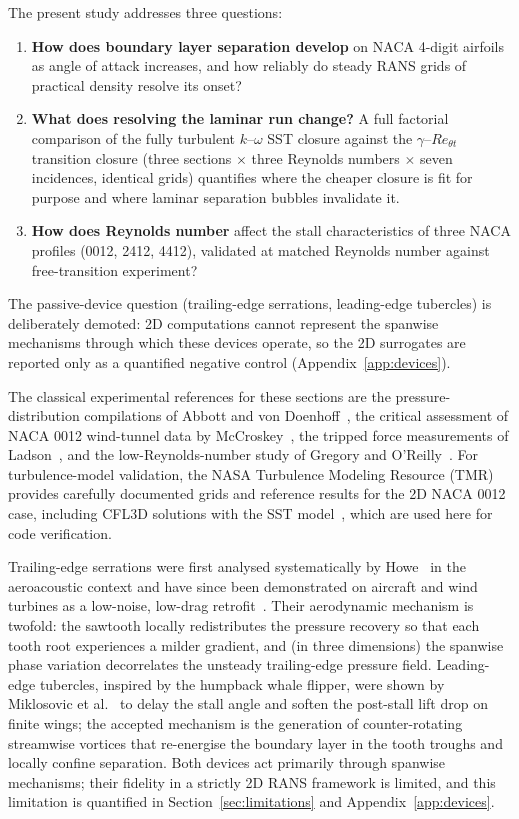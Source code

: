 \documentclass[11pt,a4paper]{article}
\begin{document}
The present study addresses three questions:
\begin{enumerate}
  \item \textbf{How does boundary layer separation develop} on NACA 4-digit airfoils as angle of attack increases, and how reliably do steady RANS grids of practical density resolve its onset?
  \item \textbf{What does resolving the laminar run change?} A full factorial comparison of the fully turbulent $k$--$\omega$ SST closure against the $\gamma$--$Re_{\theta t}$ transition closure (three sections $\times$ three Reynolds numbers $\times$ seven incidences, identical grids) quantifies where the cheaper closure is fit for purpose and where laminar separation bubbles invalidate it.
  \item \textbf{How does Reynolds number} affect the stall characteristics of three NACA profiles (0012, 2412, 4412), validated at matched Reynolds number against free-transition experiment?
\end{enumerate}
The passive-device question (trailing-edge serrations, leading-edge tubercles) is deliberately demoted: 2D computations cannot represent the spanwise mechanisms through which these devices operate, so the 2D surrogates are reported only as a quantified negative control (Appendix~\ref{app:devices}).

The classical experimental references for these sections are the pressure-distribution compilations of Abbott and von Doenhoff~\cite{abbott1959}, the critical assessment of NACA 0012 wind-tunnel data by McCroskey~\cite{mccroskey1987}, the tripped force measurements of Ladson~\cite{ladson1988}, and the low-Reynolds-number study of Gregory and O'Reilly~\cite{gregory1970}. For turbulence-model validation, the NASA Turbulence Modeling Resource (TMR)~\cite{tmr} provides carefully documented grids and reference results for the 2D NACA 0012 case, including CFL3D solutions with the SST model~\cite{cfl3dtmr}, which are used here for code verification.

Trailing-edge serrations were first analysed systematically by Howe~\cite{howe1991} in the aeroacoustic context and have since been demonstrated on aircraft and wind turbines as a low-noise, low-drag retrofit~\cite{hansen2016}. Their aerodynamic mechanism is twofold: the sawtooth locally redistributes the pressure recovery so that each tooth root experiences a milder gradient, and (in three dimensions) the spanwise phase variation decorrelates the unsteady trailing-edge pressure field. Leading-edge tubercles, inspired by the humpback whale flipper, were shown by Miklosovic et al.~\cite{miklosovic2004} to delay the stall angle and soften the post-stall lift drop on finite wings; the accepted mechanism is the generation of counter-rotating streamwise vortices that re-energise the boundary layer in the tooth troughs and locally confine separation. Both devices act primarily through spanwise mechanisms; their fidelity in a strictly 2D RANS framework is limited, and this limitation is quantified in Section~\ref{sec:limitations} and Appendix~\ref{app:devices}.
\end{document}
